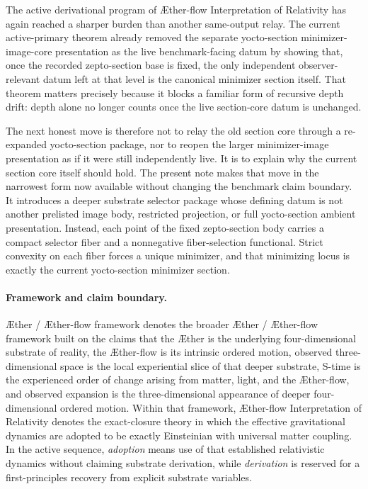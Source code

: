 \documentclass[11pt]{article}
\newcommand{\Aether}{\AE{}ther}
\newcommand{\Aflow}{\AE{}ther-flow}
\newcommand{\TheoryName}{\Aflow{} Interpretation of Relativity}
\newcommand{\TheoryProgram}{\Aether{} / \Aflow{} framework}
\begin{document}
The active derivational program of \TheoryName{} has again reached a sharper burden than another same-output relay. The current active-primary theorem already removed the separate yocto-section minimizer-image-core presentation as the live benchmark-facing datum by showing that, once the recorded zepto-section base is fixed, the only independent observer-relevant datum left at that level is the canonical minimizer section itself. That theorem matters precisely because it blocks a familiar form of recursive depth drift: depth alone no longer counts once the live section-core datum is unchanged.

The next honest move is therefore not to relay the old section core through a re-expanded yocto-section package, nor to reopen the larger minimizer-image presentation as if it were still independently live. It is to explain why the current section core itself should hold. The present note makes that move in the narrowest form now available without changing the benchmark claim boundary. It introduces a deeper substrate selector package whose defining datum is not another prelisted image body, restricted projection, or full yocto-section ambient presentation. Instead, each point of the fixed zepto-section body carries a compact selector fiber and a nonnegative fiber-selection functional. Strict convexity on each fiber forces a unique minimizer, and that minimizing locus is exactly the current yocto-section minimizer section.

\paragraph{Framework and claim boundary.}
\TheoryProgram{} denotes the broader \Aether{} / \Aflow{} framework built on the claims that the \Aether{} is the underlying four-dimensional substrate of reality, the \Aflow{} is its intrinsic ordered motion, observed three-dimensional space is the local experiential slice of that deeper substrate, S-time is the experienced order of change arising from matter, light, and the \Aflow{}, and observed expansion is the three-dimensional appearance of deeper four-dimensional ordered motion. Within that framework, \TheoryName{} denotes the exact-closure theory in which the effective gravitational dynamics are adopted to be exactly Einsteinian with universal matter coupling. In the active sequence, \emph{adoption} means use of that established relativistic dynamics without claiming substrate derivation, while \emph{derivation} is reserved for a first-principles recovery from explicit substrate variables.
\end{document}
